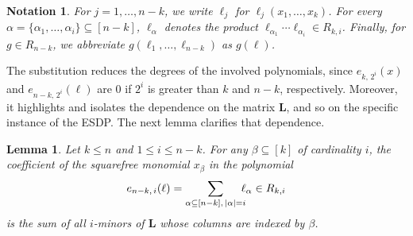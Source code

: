 \documentclass[11pt]{article}
\newcommand{\es}[2]{e_{#1,\, #2}}
\theoremstyle{plain}
\newtheorem{lem}[theo]{Lemma}
\newtheorem{notat}{Notation}[section]
\theoremstyle{definition}
\theoremstyle{remark}
\begin{document}
\begin{notat}
    For $j=1,\dots,n-k$, we write $\ell_j$ for $\ell_j(x_1,\dots,x_k)$. For every $\alpha=\{\alpha_1,\dots,\alpha_i\}\subseteq [n-k]$, $\ell_\alpha$ denotes the product $\ell_{\alpha_1}\cdots\ell_{\alpha_i}\in R_{k,i}$. Finally, for $g\in R_{n-k}$, we abbreviate $g(\ell_1,\dots,\ell_{n-k})$ as $g(\ell)$.
\end{notat}

The substitution reduces the degrees of the involved polynomials, since $\es{k}{2^i}(x)$ and $\es{n-k}{2^i}(\ell)$ are $0$ if $2^i$ is greater than $k$ and $n-k$, respectively.
Moreover, it highlights and isolates the dependence on the matrix $\mathbf{L}$, and so on the specific instance of the ESDP. The next lemma clarifies that dependence.

\begin{lem}
    Let $k\leq n$ and $1\leq i\leq n-k$. For any $\beta\subseteq[k]$ of cardinality $i$, the coefficient of the squarefree monomial $x_\beta$ in the polynomial \begin{equation*}
        \es{n-k}{i}(\ell)=\sum\limits_{\alpha\subseteq [n-k],\,|\alpha|=i}\hspace{-0.2cm}\ell_\alpha\in R_{k,i}
    \end{equation*}
    is the sum of all $i$-minors of $\mathbf{L}$ whose columns are indexed by $\beta$.
\end{lem}
\end{document}
